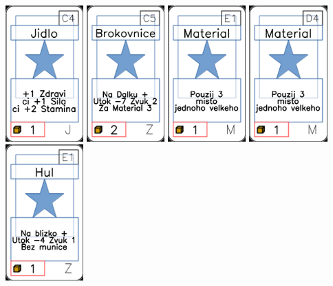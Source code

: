 \documentclass[a4paper]{article}
\begin{document}
	\includegraphics[width=3.0cm]{img-1_13}
	\includegraphics[width=3.0cm]{img-1_104}
	\includegraphics[width=3.0cm]{img-1_50}
	\includegraphics[width=3.0cm]{img-1_48}
	\includegraphics[width=3.0cm]{img-1_80}
\end{document}
